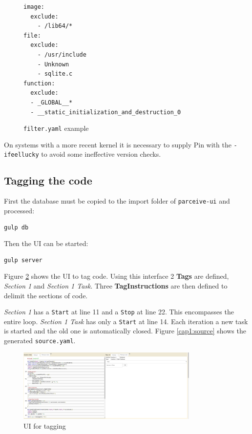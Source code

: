 \begin{figure}
	\begin{center}
		\begin{verbatim}
image:
  exclude:
    - /lib64/*
file:
  exclude:
    - /usr/include
    - Unknown
    - sqlite.c
function:
  exclude:
  - _GLOBAL__*
  - __static_initialization_and_destruction_0
		\end{verbatim}
	\end{center}
	\caption{\texttt{filter.yaml} example}
	\label{cap1:filter}
\end{figure}

On systems with a more recent kernel it is necessary to supply Pin with the \texttt{-ifeellucky} to avoid some ineffective version checks.

\subsection {Tagging the code}

First the database must be copied to the import folder of \texttt{parceive-ui} and processed:

\begin{lstlisting}[style=BashInputStyle]
gulp db
\end{lstlisting}

Then the UI can be started:

\begin{lstlisting}[style=BashInputStyle]
gulp server
\end{lstlisting}

Figure \ref{cap1:tagview} shows the UI to tag code. Using this interface 2 \textbf{Tags} are defined, \textit{Section 1} and \textit{Section 1 Task}. Three \textbf{TagInstructions} are then defined to delimit the sections of code.

\textit{Section 1} has a \texttt{Start} at line 11 and a \texttt{Stop} at line 22. This encompasses the entire loop.  \textit{Section 1 Task} has only a \texttt{Start} at line 14. Each iteration a new task is started and the old one is automatically closed. Figure \ref{cap1:source} shows the generated \texttt{source.yaml}.

\begin{figure}[!ht]
	\centering
	\includegraphics[width=0.8\textwidth]{tagging-view}
	\caption{UI for tagging}
	\label{cap1:tagview}
\end{figure}

